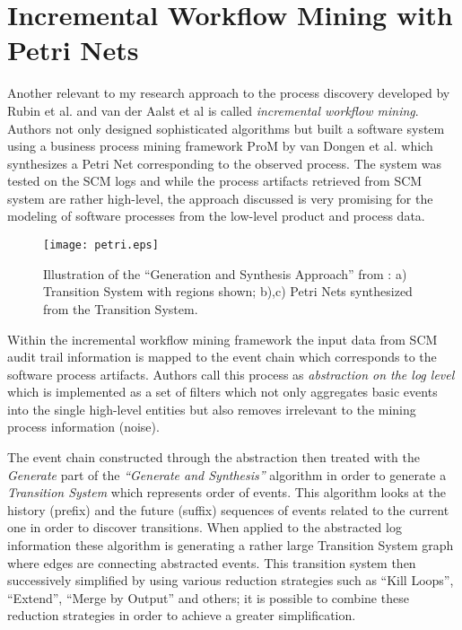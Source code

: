 \section{Incremental Workflow Mining with Petri Nets}
Another relevant to my research approach to the process discovery developed by Rubin et al. \cite{citeulike:1885717} and van der Aalst et al \cite{citeulike:3718014} is called \textit{incremental workflow mining}. Authors not only designed sophisticated algorithms but built a software system using a business process mining framework ProM by van Dongen et al. \cite{citeulike:5043673} which synthesizes a Petri Net corresponding to the observed process. 
The system was tested on the SCM logs and while the process artifacts retrieved from SCM system are rather high-level, the approach discussed is very promising for the modeling of software processes from the low-level product and process data.

\begin{figure}[tbp]
   \centering
   \texttt{[image: petri.eps]}
   \caption{Illustration of the ``Generation and Synthesis Approach'' from \cite{citeulike:5043673}: a) Transition System with regions shown; b),c) Petri Nets synthesized from the Transition System.}
   \label{fig:petri}
\end{figure}

Within the incremental workflow mining framework the input data from SCM audit trail information is mapped to the event chain which corresponds to the software process artifacts. Authors call this process as \textit{abstraction on the log level} which is implemented as a set of filters which not only aggregates basic events into the single high-level entities but also removes irrelevant to the mining process information (noise). 

The event chain constructed through the abstraction then treated with the \textit{Generate} part of the \textit{``Generate and Synthesis''} \cite{citeulike:3718014} algorithm in order to generate a \textit{Transition System} which represents order of events. This algorithm looks at the history (prefix) and the future (suffix) sequences of events related to the current one in order to discover transitions.  When applied to the abstracted log information these algorithm is generating a rather large Transition System graph where edges are connecting abstracted events. This transition system then successively simplified by using various reduction strategies such as ``Kill Loops'', ``Extend'', ``Merge by Output'' and others; it is possible to combine these reduction strategies in order to achieve a greater simplification.

